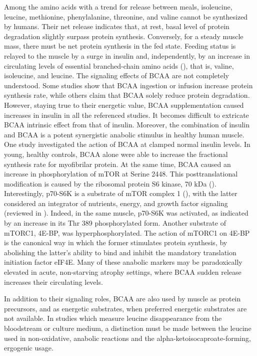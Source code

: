 \documentclass[12pt,english]{report}\usepackage[]{graphicx}\usepackage[]{color}
\begin{document}
Among the amino acids with a trend for release between meals, isoleucine,
leucine, methionine, phenylalanine, threonine, and valine cannot be
synthesized by humans. Their net release indicates that, at rest,
basal level of protein degradation slightly surpass protein synthesis.
Conversely, for a steady muscle mass, there must be net protein synthesis
in the fed state. Feeding status is relayed to the muscle by a surge
in insulin and, independently, by an increase in circulating levels
of essential branched-chain amino acids (),
that is, valine, isoleucine, and leucine. The signaling effects of
BCAA are not completely understood. Some studies show that BCAA ingestion
or infusion increase protein synthesis rate\citep{bennet1989increase},
while others claim that BCAA solely reduce protein degradation\citep{nair1992leucine}.
However, staying true to their energetic value, BCAA supplementation
caused increases in insulin in all the referenced studies. It becomes
difficult to extricate BCAA intrinsic effect from that of insulin.
Moreover, the combination of insulin and BCAA is a potent synergistic
anabolic stimulus in healthy human muscle\citep{barazzoni2012insulin}.
One study investigated the action of BCAA at clamped normal insulin
levels\citep{cuthbertson2005anabolic}. In young, healthy controls,
BCAA alone were able to increase the fractional synthesis rate for
myofibrilar protein. At the same time, BCAA caused an increase in
phosphorylation of mTOR at Serine 2448. This posttranslational modification
is caused by the ribosomal protein S6 kinase, 70 kDa ()\citep{chiang2005phosphorylation}.
Interestingly, p70-S6K is a substrate of mTOR complex 1 (),
with the latter considered an integrator of nutrients, energy, and
growth factor signaling (reviewed in \citep{laplante2012mtor}). Indeed,
in the same muscle, p70-S6K was activated, as indicated by an increase
in its Thr 389 phosphorylated form. Another substrate of mTORC1, 4E-BP,
was hyperphosphorylated. The action of mTORC1 on 4E-BP is the canonical
way in which the former stimulates protein synthesis, by abolishing
the latter's ability to bind and inhibit the mandatory translation
initiation factor eIF4E. Many of these anabolic markers may be paradoxically
elevated in acute, non-starving atrophy settings, where BCAA sudden
release increases their circulating levels.

In addition to their signaling roles, BCAA are also used by muscle
as protein precursors, and as energetic substrates, when preferred
energetic substrates are not available\citep{suryawan1998molecular}.
In studies which measure leucine disappearance from the bloodstream
or culture medium, a distinction must be made between the leucine
used in non-oxidative, anabolic reactions and the alpha-ketoisocaproate-forming,
ergogenic usage. 
\end{document}
